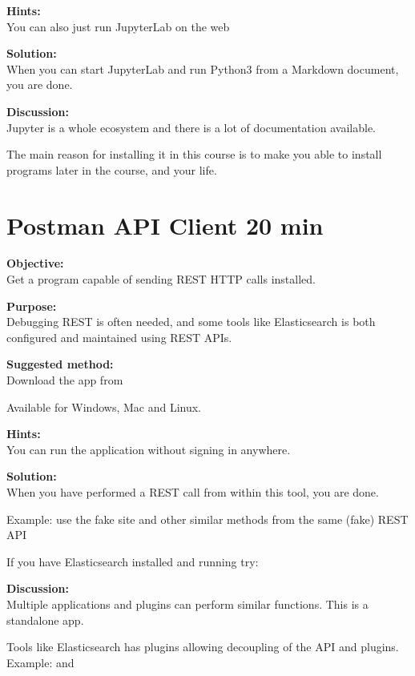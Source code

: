 \documentclass[a4paper,11pt,notitlepage]{report}
\begin{document}
{\bf Hints:}\\
You can also just run JupyterLab on the web \smiley

{\bf Solution:}\\
When you can start JupyterLab and run Python3 from a Markdown document, you are done.


{\bf Discussion:}\\
Jupyter is a whole ecosystem and there is a lot of documentation available.

The main reason for installing it in this course is to make you able to install programs later in the course, and your life.



\chapter{Postman API Client 20 min}
\label{ex:postman-api}


{\bf Objective:}\\
Get a program capable of sending REST HTTP calls installed.


{\bf Purpose:}\\
Debugging REST is often needed, and some tools like Elasticsearch is both configured and maintained using REST APIs.

{\bf Suggested method:}\\
Download the app from

Available for Windows, Mac and Linux.

{\bf Hints:}\\
You can run the application without signing in anywhere.

{\bf Solution:}\\
When you have performed a REST call from within this tool, you are done.

Example: use the fake site  and other similar methods from the same (fake) REST API

If you have Elasticsearch installed and running try: 

{\bf Discussion:}\\
Multiple applications and plugins can perform similar functions. This is a standalone app.

Tools like Elasticsearch has plugins allowing decoupling of the API and plugins. Example:  and 
\end{document}
